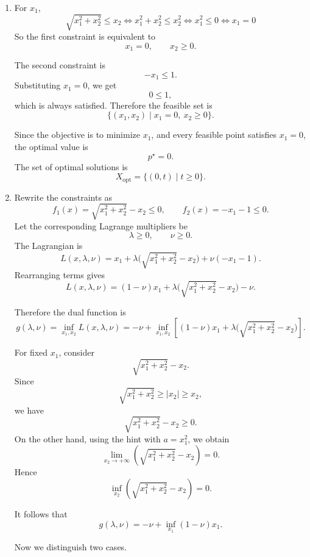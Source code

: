 \documentclass[11pt,letter,notitlepage]{article}
\theoremstyle{definition}
\begin{document}
\begin{solution}
\leavevmode\vspace{-2em}

\begin{enumerate} 
    \item[(a)] For $x_1$,
    \[
    \sqrt{x_1^2+x_2^2}\le x_2
    \Longleftrightarrow
    x_1^2+x_2^2\le x_2^2
    \Longleftrightarrow
    x_1^2\le 0
    \Longleftrightarrow
    x_1=0
    \]
    So the first constraint is equivalent to
    \[
    x_1=0,\qquad x_2\ge 0.
    \]

    The second constraint is
    \[
    -x_1\le 1.
    \]
    Substituting $x_1=0$, we get
    \[
    0\le 1,
    \]
    which is always satisfied. Therefore the feasible set is
    \[
    \{(x_1,x_2)\mid x_1=0,\ x_2\ge 0\}.
    \]

    Since the objective is to minimize $x_1$, and every feasible point
    satisfies $x_1=0$, the optimal value is
    \[
    p^\star=0.
    \]
    The set of optimal solutions is
    \[
    X_{\mathrm{opt}}=\{(0,t)\mid t\ge 0\}.
    \]

    \item[(b)] Rewrite the constraints as
    \[
    f_1(x)=\sqrt{x_1^2+x_2^2}-x_2\le 0,
    \qquad
    f_2(x)=-x_1-1\le 0.
    \]
    Let the corresponding Lagrange multipliers be
    \[
    \lambda\ge 0,\qquad \nu\ge 0.
    \]
    The Lagrangian is
    \[
    L(x,\lambda,\nu)
    =
    x_1+\lambda\bigl(\sqrt{x_1^2+x_2^2}-x_2\bigr)+\nu(-x_1-1).
    \]
    Rearranging terms gives
    \[
    L(x,\lambda,\nu)
    =
    (1-\nu)x_1+\lambda\bigl(\sqrt{x_1^2+x_2^2}-x_2\bigr)-\nu.
    \]

    Therefore the dual function is
    \[
    g(\lambda,\nu)
    =
    \inf_{x_1,x_2}L(x,\lambda,\nu)
    =
    -\nu+\inf_{x_1,x_2}
    \left[
    (1-\nu)x_1+\lambda\bigl(\sqrt{x_1^2+x_2^2}-x_2\bigr)
    \right].
    \]

    For fixed $x_1$, consider
    \[
    \sqrt{x_1^2+x_2^2}-x_2.
    \]
    Since
    \[
    \sqrt{x_1^2+x_2^2}\ge |x_2|\ge x_2,
    \]
    we have
    \[
    \sqrt{x_1^2+x_2^2}-x_2\ge 0.
    \]
    On the other hand, using the hint with $a=x_1^2$, we obtain
    \[
    \lim_{x_2\to+\infty}\left(\sqrt{x_1^2+x_2^2}-x_2\right)=0.
    \]
    Hence
    \[
    \inf_{x_2}\left(\sqrt{x_1^2+x_2^2}-x_2\right)=0.
    \]

    It follows that
    \[
    g(\lambda,\nu)
    =
    -\nu+\inf_{x_1}(1-\nu)x_1.
    \]

    Now we distinguish two cases.


\end{enumerate}
\end{solution}
\end{document}
